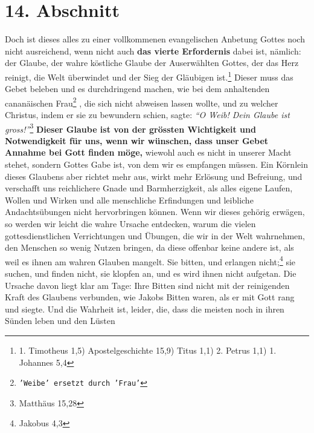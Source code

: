 \section{14. Abschnitt} \label{kap6_ab14}

Doch ist dieses alles zu einer vollkommenen evangelischen Anbetung Gottes noch
nicht ausreichend, wenn nicht auch \textbf{das vierte Erfordernis} dabei ist,
nämlich:
der Glaube, der wahre köstliche Glaube der Auserwählten Gottes, der das Herz
reinigt, die Welt überwindet und der Sieg der Gläubigen ist.\footnote{1.
Timotheus 1,5) Apostelgeschichte 15,9) Titus 1,1) 2. Petrus 1,1) 1.
Johannes 5,4}
Dieser muss das
Gebet beleben und es durchdringend machen, wie bei dem anhaltenden cananäischen
Frau\footnote{\texttt{'Weibe' ersetzt durch 'Frau'}}
 
, die sich
nicht abweisen lassen wollte, und zu welcher Christus, indem er
sie zu bewundern schien, sagte:
\textit{"`O Weib! Dein Glaube ist gross!"'}\footnote{Matthäus 15,28}
\textbf{Dieser Glaube ist von der grössten
Wichtigkeit
und Notwendigkeit für uns, wenn wir wünschen, dass unser Gebet Annahme bei Gott
finden möge,} wiewohl auch es nicht in unserer Macht stehet, sondern Gottes Gabe
ist, von dem wir es empfangen müssen. Ein Körnlein dieses Glaubens aber richtet
mehr aus, wirkt mehr Erlösung und Befreiung, und verschafft uns
reichlichere
Gnade und Barmherzigkeit, als alles eigene Laufen, Wollen und Wirken und alle
menschliche Erfindungen und leibliche Andachtsübungen nicht hervorbringen
können. Wenn wir dieses gehörig erwägen, so werden wir leicht die wahre Ursache
entdecken, warum die vielen gottesdienstlichen Verrichtungen und Übungen, die
wir in der Welt wahrnehmen, den Menschen so wenig Nutzen bringen, da diese
offenbar keine andere ist, als weil es ihnen am wahren Glauben mangelt. Sie
bitten, und erlangen nicht;\footnote{Jakobus 4,3}
sie suchen, und finden nicht, sie
klopfen an, und es wird ihnen nicht aufgetan. Die Ursache davon liegt klar am
Tage: Ihre Bitten sind nicht mit der reinigenden Kraft des Glaubens verbunden,
wie Jakobs  Bitten waren, als er mit Gott rang und
siegte. Und die Wahrheit
ist, leider, die, dass die meisten noch in ihren Sünden leben und den Lüsten
